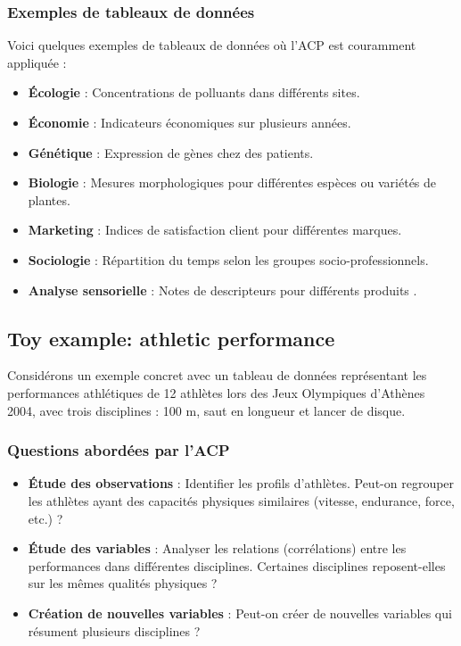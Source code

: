 \documentclass[10pt,a4paper]{article}
\begin{document}
\subsubsection*{Exemples de tableaux de données}
Voici quelques exemples de tableaux de données où l'ACP est couramment appliquée :
\begin{itemize}
    \item \textbf{Écologie} : Concentrations de polluants dans différents sites.
    \item \textbf{Économie} : Indicateurs économiques sur plusieurs années.
    \item \textbf{Génétique} : Expression de gènes chez des patients.
    \item \textbf{Biologie} : Mesures morphologiques pour différentes espèces ou variétés de plantes.
    \item \textbf{Marketing} : Indices de satisfaction client pour différentes marques.
    \item \textbf{Sociologie} : Répartition du temps selon les groupes socio-professionnels.
    \item \textbf{Analyse sensorielle} : Notes de descripteurs pour différents produits \cite{builtin_pca}.
\end{itemize}

\subsection*{Toy example: athletic performance}
Considérons un exemple concret avec un tableau de données représentant les performances athlétiques de 12 athlètes lors des Jeux Olympiques d'Athènes 2004, avec trois disciplines : 100 m, saut en longueur et lancer de disque.


\subsubsection*{Questions abordées par l'ACP}
\begin{itemize}
    \item \textbf{Étude des observations} : Identifier les profils d'athlètes. Peut-on regrouper les athlètes ayant des capacités physiques similaires (vitesse, endurance, force, etc.) ?
    \item \textbf{Étude des variables} : Analyser les relations (corrélations) entre les performances dans différentes disciplines. Certaines disciplines reposent-elles sur les mêmes qualités physiques ?
    \item \textbf{Création de nouvelles variables} : Peut-on créer de nouvelles variables qui résument plusieurs disciplines \cite{builtin_pca} ?
\end{itemize}
\end{document}
